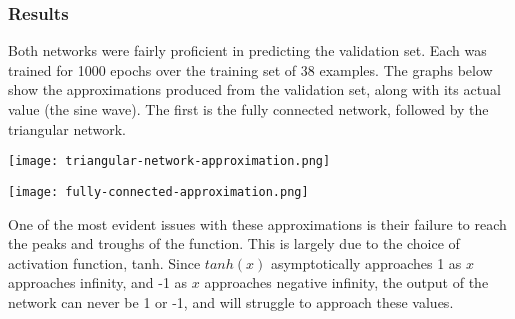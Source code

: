 \documentclass[a4paper, 11pt]{article} %
\begin{document}
\subsubsection*{Results}

Both networks were fairly proficient in predicting the validation set.  Each was trained for 1000 epochs over the training set of 38 examples.  The graphs below show the approximations produced from the validation set, along with its actual value (the sine wave).  The first is the fully connected network, followed by the triangular network.

\texttt{[image: triangular-network-approximation.png]}

\texttt{[image: fully-connected-approximation.png]}

One of the most evident issues with these approximations is their failure to reach the peaks and troughs of the function.  This is largely due to the choice of activation function, tanh.  Since $tanh(x)$ asymptotically approaches 1 as $x$ approaches infinity, and -1 as $x$ approaches negative infinity, the output of the network can never be 1 or -1, and will struggle to approach these values.

\printbibliography

\end{document}
